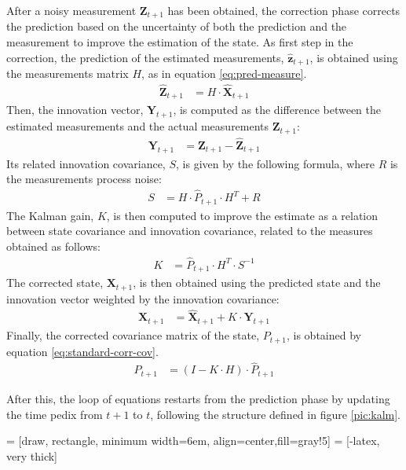 After a noisy measurement $\mathbf{Z}_{t+1}$ has been obtained, the correction phase corrects the prediction based on the uncertainty of both the prediction and the measurement to improve the estimation of the state.
As first step in the correction, the prediction of the estimated measurements, $\hat{\mathbf{z}}_{t+1}$, is obtained using the measurements matrix $H$, as in equation \eqref{eq:pred-measure}.
    \begin{align}
    \hat{\mathbf{Z}}_{t+1} & = H \cdot \hat{\mathbf{X}}_{t+1}
    \label{eq:pred-measure}
    \end{align}
Then, the innovation vector, $\mathbf{Y}_{t+1}$, is computed as the difference between the estimated measurements and the actual measurements $\mathbf{Z}_{t+1}$:
    \begin{align}
    \mathbf{Y}_{t+1} & = \mathbf{Z}_{t+1} - \hat{\mathbf{Z}}_{t+1}
    \end{align}
Its related innovation covariance, $S$, is given by the following formula, where $R$ is the measurements process noise:
    \begin{align}
    S & = H \cdot \hat{P}_{t+1} \cdot H^T + R
    \end{align}
The Kalman gain, $K$, is then computed to improve the estimate as a relation between state covariance and innovation covariance, related to the measures obtained as follows:
    \begin{align}
    K & = \hat{P}_{t+1} \cdot H^T \cdot S^{-1}
    \end{align}
The corrected state, $\mathbf{X}_{t+1}$, is then obtained using the predicted state and the innovation vector weighted by the innovation covariance:
    \begin{align}
    \mathbf{X}_{t+1} & = \hat{\mathbf{X}}_{t+1} + K \cdot \mathbf{Y}_{t+1}
    \end{align}
Finally, the corrected covariance matrix of the state, $P_{t+1}$, is obtained by equation \eqref{eq:standard-corr-cov}.
    \begin{align}
    	\label{eq:standard-corr-cov}
    P_{t+1} & = (I - K \cdot H) \cdot \hat{P}_{t+1}
    \end{align}

After this, the loop of equations restarts from the prediction phase by updating the time pedix from $t+1$ to $t$, following the structure defined in figure \ref{pic:kalm}.

 = [draw, rectangle, minimum width=6em, align=center,fill=gray!5]
 = [-latex, very thick]
\newcommand*{\tran}{\top}

